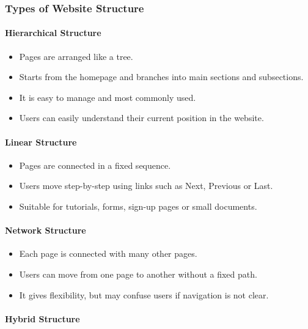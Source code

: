 \subsubsection{Types of Website Structure}

\paragraph{Hierarchical Structure}

\begin{itemize}
    \item Pages are arranged like a tree.
    \item Starts from the homepage and branches into main sections and subsections.
    \item It is easy to manage and most commonly used.
    \item Users can easily understand their current position in the website.
\end{itemize}

\paragraph{Linear Structure}

\begin{itemize}
    \item Pages are connected in a fixed sequence.
    \item Users move step-by-step using links such as Next, Previous or Last.
    \item Suitable for tutorials, forms, sign-up pages or small documents.
\end{itemize}

\paragraph{Network Structure}

\begin{itemize}
    \item Each page is connected with many other pages.
    \item Users can move from one page to another without a fixed path.
    \item It gives flexibility, but may confuse users if navigation is not clear.
\end{itemize}

\paragraph{Hybrid Structure}

